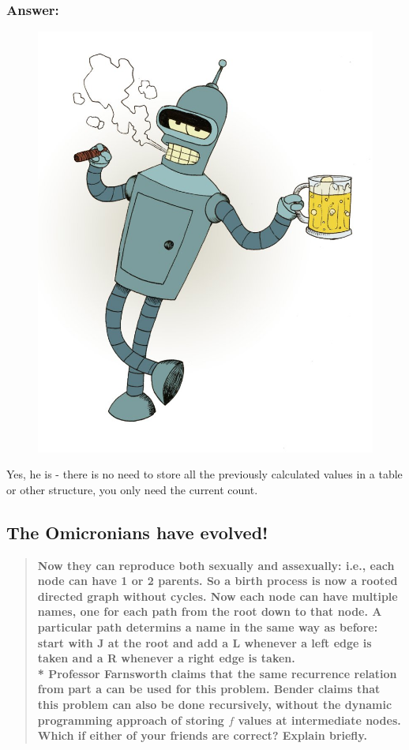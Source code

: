 \documentclass[titlepage]{article}
\theoremstyle{definition}
\begin{document}
      \subsubsection{Answer:}
        \begin{figure}
          \centering
            \includegraphics[scale=0.3]{bender}
        \end{figure}
        Yes, he is - there is no need to store all the previously calculated values in
        a table or other structure, you only need the current count. 

  \subsection{The Omicronians have evolved!} 
  \begin{quote}
    \textbf{Now they can reproduce both sexually
    and assexually: i.e., each node can have 1 or 2 parents. So a birth process
    is now a rooted directed graph without cycles. Now each node can have
    multiple names, one for each path from the root down to that node. A
    particular path determins a name in the same way as before: start with J at
    the root and add a L whenever a left edge is taken and a R whenever a right
    edge is taken. \\*
    Professor Farnsworth claims that the same recurrence relation from part a
    can be used for this problem. Bender claims that this problem can also be
    done recursively, without the dynamic programming approach of storing $f$
    values at intermediate nodes. Which if either of your friends are correct?
    Explain briefly.}
  \end{quote}
\end{document}
